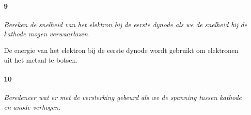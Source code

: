 \paragraph{9}

\textit{Bereken de snelheid van het elektron bij de eerste dynode
als we de snelheid bij de kathode mogen verwaarlozen.}

De energie van het elektron bij de eerste dynode wordt gebruikt om
elektronen uit het metaal te botsen.

\paragraph{10}

\textit{Beredeneer wat er met de versterking gebeurd als we de spanning
tussen kathode en anode verhogen.}


